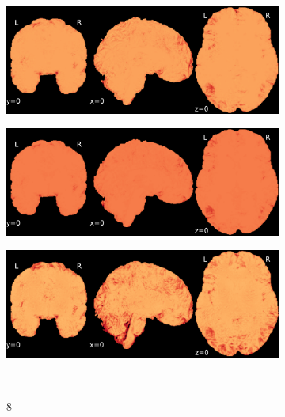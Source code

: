\documentclass{article}
\begin{document}
\begin{appendices}
\begin{landscape}
\begin{figure}
\begin{subfigure}[t]{0.2\paperheight}
            \end{subfigure}
            \begin{subfigure}[t]{0.2\paperheight}
                \centering
                \includegraphics[width=\textwidth]{figures/sig/0mm/rr_ds002338_sub-xp201_sig.pdf}
            \end{subfigure}
            \begin{subfigure}[t]{0.2\paperheight}
                \centering
                \includegraphics[width=\textwidth]{figures/sig/0mm/rs_ds002338_sub-xp201_sig.pdf}
            \end{subfigure}
            \begin{subfigure}[t]{0.2\paperheight}
                \centering
                \includegraphics[width=\textwidth]{figures/sig/0mm/rr.rs_ds002338_sub-xp201_sig.pdf}
            \end{subfigure} \\
            \begin{subfigure}[b][][c]{0.01\paperwidth} 8 \vspace*{15pt} \end{subfigure}

\end{figure}
\end{landscape}
\end{appendices}
\end{document}
